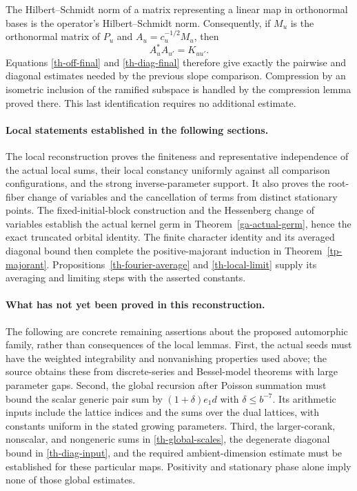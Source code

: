 The Hilbert--Schmidt norm of a matrix representing a linear map in
orthonormal bases is the operator's Hilbert--Schmidt norm.
Consequently, if $M_u$ is the orthonormal matrix of $P_u$ and
$A_u=c_u^{-1/2}M_u$, then
\[
 A_u^*A_{u'}=K_{uu'}.
\]
Equations \eqref{th-off-final} and \eqref{th-diag-final} therefore
give exactly the pairwise and diagonal estimates needed by the
previous slope comparison.  Compression by an isometric inclusion
of the ramified subspace is handled by the compression lemma proved
there.  This last identification requires no additional estimate.

\paragraph{Local statements established in the following sections.}
The local reconstruction proves the
finiteness and representative independence of the actual local
sums, their local constancy uniformly against all comparison
configurations, and the strong inverse-parameter support.  It also
proves the root-fiber change of variables and the cancellation of
terms from distinct stationary points.  The fixed-initial-block
construction and the Hessenberg change of variables establish the
actual kernel germ in Theorem~\ref{ga-actual-germ}, hence the exact
truncated orbital identity.  The finite character identity and its
averaged diagonal bound then complete the positive-majorant
induction in Theorem~\ref{tp-majorant}.
Propositions~\ref{th-fourier-average} and \ref{th-local-limit}
supply its averaging and limiting steps with the asserted constants.

\paragraph{What has not yet been proved in this reconstruction.}
The following are concrete remaining assertions about the proposed
automorphic family, rather than consequences of the local lemmas.
First, the actual seeds must have the weighted integrability and
nonvanishing properties used above; the source obtains these from
discrete-series and Bessel-model theorems with large parameter gaps.
Second, the global recursion after Poisson summation must
bound the scalar generic pair sum by $(1+\delta)e_1d$ with
$\delta\le b^{-7}$.  Its arithmetic inputs include the lattice
indices and the sums over the dual lattices, with constants uniform
in the stated growing parameters.  Third, the larger-corank,
nonscalar, and nongeneric sums in \eqref{th-global-scales}, the
degenerate diagonal bound in \eqref{th-diag-input}, and the required
ambient-dimension estimate must be established for these particular
maps.  Positivity and stationary phase alone imply none of those
global estimates.

